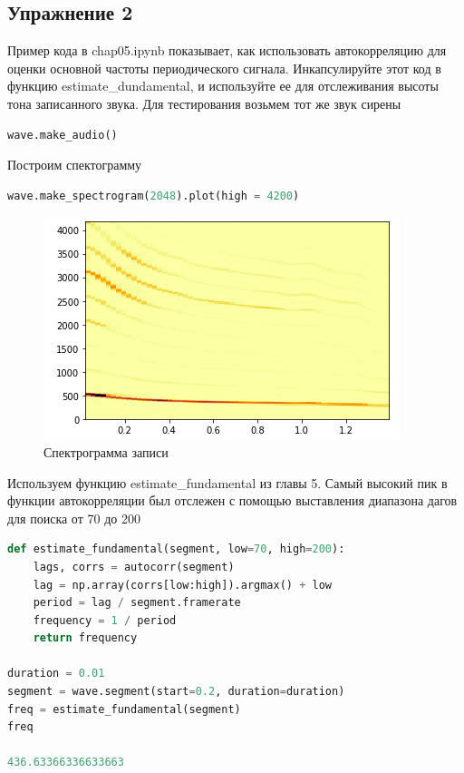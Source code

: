 \subsection{Упражнение 2}
Пример кода в chap05.ipynb показывает, как использовать автокорреляцию для оценки основной частоты периодического сигнала. Инкапсулируйте этот код в функцию estimate_dundamental, и используйте ее для отслеживания высоты тона записанного звука. Для тестирования возьмем тот же звук сирены

\begin{lstlisting}[language=Python]
wave.make_audio()
\end{lstlisting}

Построим спектограмму

\begin{lstlisting}[language=Python]
wave.make_spectrogram(2048).plot(high = 4200)
\end{lstlisting}

\begin{figure}[H]
	\begin{center}
		\includegraphics[scale=1]{fig/lab05/lab05_03.png}
		\caption{Спектрограмма записи}
	\end{center}
\end{figure}

Используем функцию estimate_fundamental из главы 5. Самый высокий пик в функции автокорреляции был отслежен с помощью выставления диапазона дагов для поиска от 70 до 200

\begin{lstlisting}[language=Python]
def estimate_fundamental(segment, low=70, high=200):
    lags, corrs = autocorr(segment)
    lag = np.array(corrs[low:high]).argmax() + low
    period = lag / segment.framerate
    frequency = 1 / period
    return frequency
    
duration = 0.01
segment = wave.segment(start=0.2, duration=duration)
freq = estimate_fundamental(segment)
freq

436.63366336633663
\end{lstlisting}


